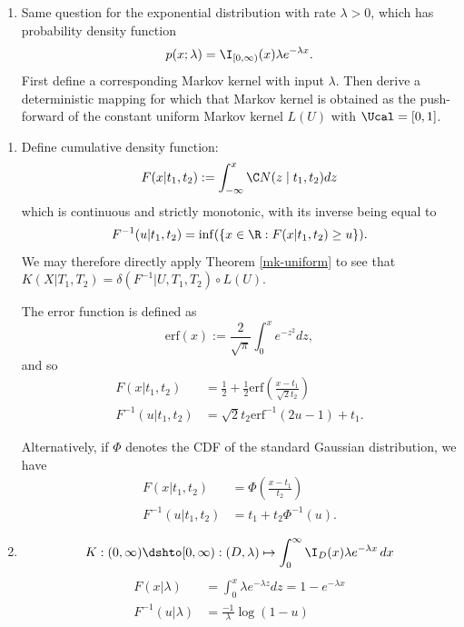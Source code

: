 \begin{enumerate}[label=4.\arabic*]
\begin{enumerate}
        \item %
        Same question for the exponential distribution with rate $\lambda > 0$, which has probability density function
        $$p(x;\lambda) = \I_{[0,\infty)}(x) \lambda e^{-\lambda x}.$$
        First define a corresponding Markov kernel with input $\lambda$. Then derive a deterministic mapping for which that Markov kernel is obtained as the push-forward of the constant uniform Markov kernel $L(U)$ with $\Ucal = [0,1]$.
    \end{enumerate}
    \begin{gradedsolution}
        \begin{enumerate}
            \item {}
            Define cumulative density function:
            \[
                F(x|t_1, t_2):= \int_{-\infty}^x \C N(z \mid t_1, t_2)dz
            \]
            which is continuous and strictly monotonic, with its inverse being equal to
            $$F^{-1}(u|t_1, t_2) = \inf(\{x\in \R : F(x | t_1,t_2) \geq u\}).$$
            We may therefore directly apply Theorem \ref*{mk-uniform} to see that $K(X|T_1, T_2) = \delta(F^{-1}|U, T_1, T_2) \circ L(U)$.

            The error function is defined as
            \begin{equation*}
                \textrm{erf}(x) := \frac{2}{\sqrt{\pi}}\int_0^x e^{-z^2}dz,
            \end{equation*}
            and so
            \begin{align*}
                F(x| t_1, t_2)       & =\frac{1}{2}+ \frac{1}{2}\text{erf}\left(\frac{x-t_1}{\sqrt{2}t_2}\right) \\
                F^{-1}(u | t_1, t_2) & =\sqrt{2}t_2 \text{erf}^{-1}(2u-1)+t_1.
            \end{align*}

            Alternatively, if $\Phi$ denotes the CDF of the standard Gaussian distribution, we have
            \begin{align*}
                F(x| t_1, t_2)       & = \Phi\left(\frac{x-t_1}{t_2}\right) \\
                F^{-1}(u | t_1, t_2) & = t_1 + t_2 \Phi^{-1}(u).
            \end{align*}

            \item {}
            $$K : (0,\infty) \dshto [0,\infty) : (D,\lambda) \mapsto \int_0^\infty \I_D(x) \lambda e^{-\lambda x} \,dx$$
            \begin{align*}
                F(x|\lambda)      & =\int_0^x \lambda e^{-\lambda z} dz = 1-e^{-\lambda x} \\
                F^{-1}(u|\lambda) & =\frac{-1}{\lambda}\log(1-u)
            \end{align*}
        \end{enumerate}
    \end{gradedsolution}

\end{enumerate}


